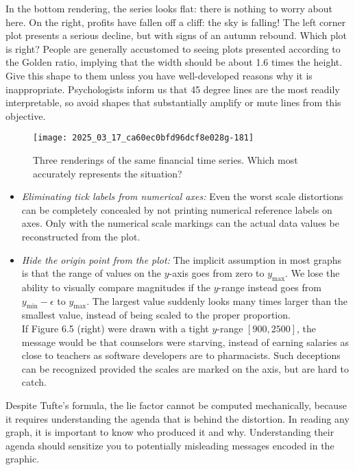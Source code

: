 \documentclass[10pt]{article}
\begin{document}
In the bottom rendering, the series looks flat: there is nothing to worry about here. On the right, profits have fallen off a cliff: the sky is falling! The left corner plot presents a serious decline, but with signs of an autumn rebound.\newline
Which plot is right? People are generally accustomed to seeing plots presented according to the Golden ratio, implying that the width should be about 1.6 times the height. Give this shape to them unless you have well-developed reasons why it is inappropriate. Psychologists inform us that 45 degree lines are the most readily interpretable, so avoid shapes that substantially amplify or mute lines from this objective.

\begin{figure}[h]
    \centering
    \texttt{[image: 2025\_03\_17\_ca60ec0bfd96dcf8e028g-181]}
    \caption{Three renderings of the same financial time series. Which most accurately represents the situation?}
\end{figure}

\begin{itemize}
  \item \emph{Eliminating tick labels from numerical axes:} Even the worst scale distortions can be completely concealed by not printing numerical reference labels on axes. Only with the numerical scale markings can the actual data values be reconstructed from the plot.
  \item \emph{Hide the origin point from the plot:} The implicit assumption in most graphs is that the range of values on the $y$-axis goes from zero to $y_{\max}$. We lose the ability to visually compare magnitudes if the $y$-range instead goes from $y_{\min} - \epsilon$ to $y_{\max}$. The largest value suddenly looks many times larger than the smallest value, instead of being scaled to the proper proportion.\\
If Figure 6.5 (right) were drawn with a tight $y$-range $[900, 2500]$, the message would be that counselors were starving, instead of earning salaries as close to teachers as software developers are to pharmacists. Such deceptions can be recognized provided the scales are marked on the axis, but are hard to catch.
\end{itemize}

Despite Tufte's formula, the lie factor cannot be computed mechanically, because it requires understanding the agenda that is behind the distortion. In reading any graph, it is important to know who produced it and why. Understanding their agenda should sensitize you to potentially misleading messages encoded in the graphic.
\end{document}
